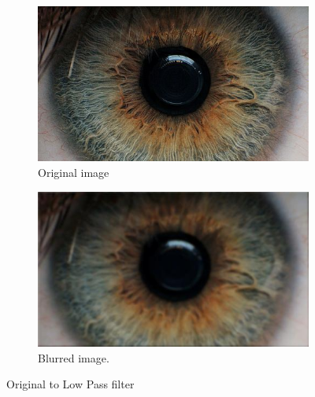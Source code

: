 \documentclass{article}
\begin{document}
%
%
\begin{figure}[H]
\centering

\begin{subfigure}{.5\textwidth}
  \centering
  \includegraphics[width=0.9\linewidth]{res/pupil/results/index.jpg}
  \caption{Original image}
  \label{fig:}
\end{subfigure}%
\begin{subfigure}{.5\textwidth}
  \centering
  \includegraphics[width=0.9\linewidth]{res/pupil/results/org_to_low.jpg}
  \caption{Blurred image.}
  \label{fig:}
\end{subfigure}


\caption{Original to Low Pass filter}
\label{fig:result_pup_org_low}
\end{figure}
\end{document}
